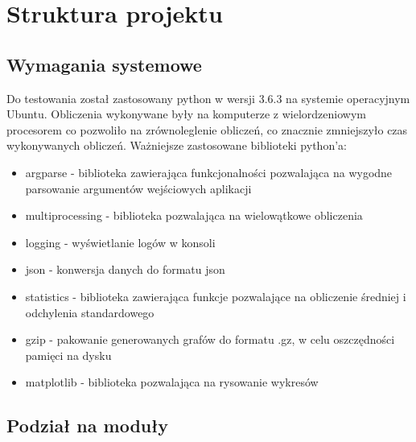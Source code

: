 
\section{Struktura projektu}
	\label{final:struktura}

	\subsection{Wymagania systemowe}
		\label{final:struktura:wymagania}

		Do testowania został zastosowany python w wersji 3.6.3 na systemie operacyjnym Ubuntu. Obliczenia wykonywane były na komputerze z wielordzeniowym procesorem co pozwoliło na zrównoleglenie obliczeń, co znacznie zmniejszyło czas wykonywanych obliczeń. Ważniejsze zastosowane biblioteki python'a:
		\begin{itemize}
			\item argparse - biblioteka zawierająca funkcjonalności pozwalająca na wygodne parsowanie argumentów wejściowych aplikacji
			\item multiprocessing - biblioteka pozwalająca na wielowątkowe obliczenia
			\item logging - wyświetlanie logów w konsoli
			\item json - konwersja danych do formatu json
			\item statistics - biblioteka zawierająca funkcje pozwalające na obliczenie średniej i odchylenia standardowego
			\item gzip - pakowanie generowanych grafów do formatu .gz, w celu oszczędności pamięci na dysku
			\item matplotlib - biblioteka pozwalająca na rysowanie wykresów
		\end{itemize}

	\subsection{Podział na moduły}
		\label{final:struktura:klasy}



